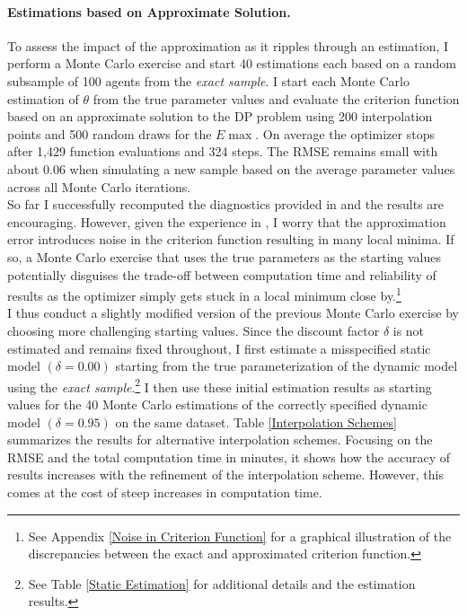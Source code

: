 \paragraph{Estimations based on Approximate Solution.}
To assess the impact of the approximation as it ripples through an estimation, I perform a Monte Carlo exercise and start 40 estimations each based on a random subsample of 100 agents from the \textit{exact sample}. I start each Monte Carlo estimation of $\theta$ from the true parameter values and evaluate the criterion function based on an approximate solution to the DP problem using 200 interpolation points and 500 random draws for the $E\max$. On average the optimizer stops after 1,429 function evaluations and 324 steps. The RMSE remains small with about 0.06 when simulating a new sample based on the average parameter values across all Monte Carlo iterations. \\\newline
%
So far I successfully recomputed the diagnostics provided in \citet{Keane.1994} and the results are encouraging. However, given the experience in \citet{Eisenhauer.2015b}, I worry that the approximation error introduces noise in the criterion function resulting in many local minima. If so, a Monte Carlo exercise that uses the true parameters as the starting values potentially disguises the trade-off between computation time and reliability of results as the optimizer simply gets stuck in a local minimum close by.\footnote{See Appendix \ref{Noise in Criterion Function} for a graphical illustration of the discrepancies between the exact and approximated criterion function.}\\\newline
%
I thus conduct a slightly modified version of the previous Monte Carlo exercise by choosing more challenging starting values. Since the discount factor $\delta$ is not estimated and remains fixed throughout, I first estimate a misspecified static model $(\delta = 0.00)$ starting from the true parameterization of the dynamic model using the \textit{exact sample}.\footnote{See Table \ref{Static Estimation} for additional details and the estimation results.} I then use these initial estimation results as starting values for the 40 Monte Carlo estimations of the correctly specified dynamic model $(\delta = 0.95)$ on the same dataset. Table \ref{Interpolation Schemes} summarizes the results for alternative interpolation schemes. Focusing on the RMSE and the total computation time in minutes, it shows how the accuracy of results increases with the refinement of the interpolation scheme. However, this comes at the cost of steep increases in computation time.

